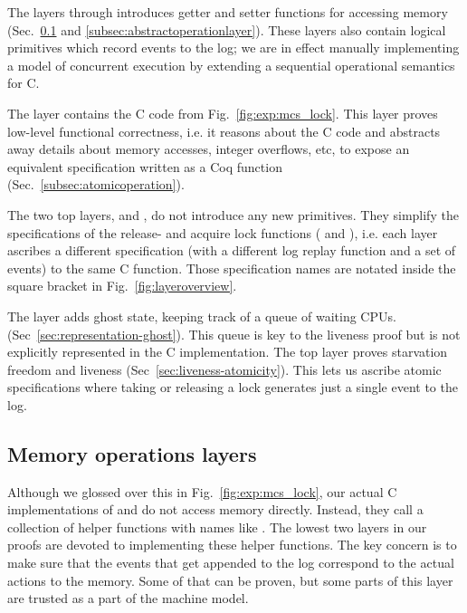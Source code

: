 The layers  through 
introduces getter and setter functions for accessing memory
(Sec.~\ref{subsec:lowestmachinemodel} and
\ref{subsec:abstractoperationlayer}). These layers also
contain logical primitives which record events to the log; we are in
effect manually implementing a model of concurrent execution by
extending a sequential operational semantics for C. 

The layer  contains the C code from 
Fig.~\ref{fig:exp:mcs_lock}. This layer proves low-level
functional correctness, i.e. it reasons about the C code and
abstracts away details about memory accesses, integer overflows, etc,
to expose an equivalent specification written as a Coq
function (Sec.~\ref{subsec:atomicoperation}).

The two top layers,  and , do not introduce any new primitives.
They simplify the specifications of 
the release- and acquire lock functions ( and
), i.e. each layer ascribes a different
specification (with a different log replay function and a set of events)
to the same C function. Those specification names are notated inside the square bracket in Fig.~\ref{fig:layeroverview}.

The layer  adds ghost state, keeping track of a
queue of waiting CPUs.
(Sec~\ref{sec:representation-ghost}). This queue is key to the liveness proof but is not explicitly represented in the C implementation.
The top layer  proves starvation freedom and liveness
(Sec~\ref{sec:liveness-atomicity}). This lets us ascribe atomic
specifications where taking or releasing a lock generates just a
single event to the log.




\subsection{Memory operations layers}
\label{subsec:lowestmachinemodel}

Although we glossed over this in Fig.~\ref{fig:exp:mcs_lock}, our
actual C implementations of  and
 do not access memory directly.  Instead, they call
a collection of helper functions with names like
. The lowest two layers in our proofs
are devoted to implementing these helper functions.
The key concern is to make sure that the events that get appended to the log
correspond to the actual actions to the memory. Some of that can be proven, 
but some parts of this layer are trusted as a part of the machine model.

